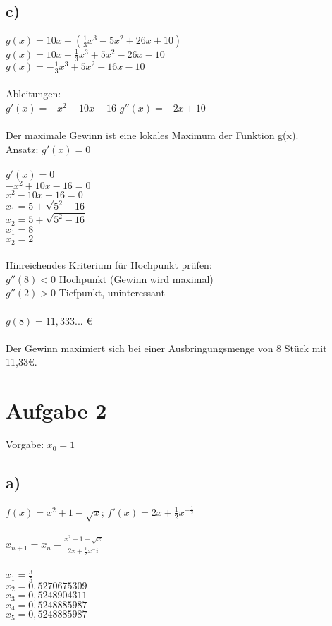 \documentclass{article}
\begin{document}
	\subsection*{c)}
	$g(x) = 10x - (\frac{1}{3}x^3 - 5x^2 + 26x +10)$ \\
	$g(x) = 10x - \frac{1}{3}x^3 + 5x^2 - 26x -10$ \\
	$g(x) =- \frac{1}{3}x^3 + 5x^2 - 16x -10$ \\ \\
	Ableitungen: \\
	$g'(x) = -x^2 + 10x - 16$ $g''(x) = -2x + 10$ \\
	\\
	Der maximale Gewinn ist eine lokales Maximum der Funktion g(x). \\
	Ansatz: $g'(x) = 0$ \\ \\
	$g'(x) = 0$ \\
	$-x^2 + 10x - 16 = 0$ \\
	$x^2 - 10x + 16 = 0$ \\
	$x_{1} = 5 + \sqrt{5^2 - 16}$ \\
	$x_{2} = 5 + \sqrt{5^2 - 16}$ \\
	$x_{1} = 8$ \\
	$x_{2} = 2$ \\
	\\
	Hinreichendes Kriterium für Hochpunkt prüfen: \\
	$g''(8) < 0$ Hochpunkt (Gewinn wird maximal) \\
	$g''(2) > 0$ Tiefpunkt, uninteressant \\
	\\
	$g(8) = 11,333...$ € \\
	\\
	Der Gewinn maximiert sich bei einer Ausbringungsmenge von 8 Stück mit 11,33€. 
	\section*{Aufgabe 2}
	Vorgabe: $x_0 = 1$
	\subsection*{a)}
	$f(x) = x^2 + 1 - \sqrt{x}$; $f'(x) = 2x + \frac{1}{2}x^{-\frac{1}{2}}$ \\ \\
	$x_{n+1} = x_n - \frac{x^2 + 1 - \sqrt{x}}{2x + \frac{1}{2}x^{-\frac{1}{2}}}$ \\ \\
	$x_1 = \frac{3}{5}$ \\
	$x_2 = 0,5270675309$ \\
	$x_3 = 0,5248904311$ \\
	$x_4 = 0,5248885987$ \\
	$x_5 = 0,5248885987$
\end{document}
